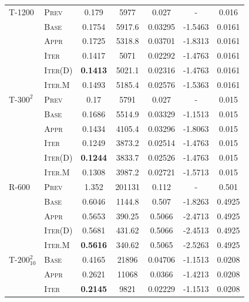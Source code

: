 \begin{table}[H]
\begin{center}
\begin{tabular}{llccccc}
    
    T-1200         & \textsc{Prev}         & 0.179  & 5977   & 0.027   &    -    & 0.016 \\
                   & \textsc{Base}      & 0.1754 & 5917.6 & 0.03295 & -1.5463 & 0.0161 \\
                   & \textsc{Appr}     & 0.1725 & 5318.8 & 0.03701 & -1.8313 & 0.0161 \\
                   & \textsc{Iter}       & 0.1417 & 5071  & 0.02292 & -1.4763 & 0.0161 \\
                   & \textsc{Iter(D)} & \textbf{0.1413} & 5021.1 & 0.02316 & -1.4763 & 0.0161 \\
                   & \textsc{Iter.M} & 0.1493 & 5185.4 & 0.02576	& -1.5363 &	0.0161\\
    \hline\rule{0pt}{2.5ex}
    T-$300^2$      & \textsc{Prev}         & 0.17   & 5791   & 0.027   &    -    & 0.015 \\
                   & \textsc{Base}      & 0.1686 & 5514.9 & 0.03329 & -1.1513 & 0.015 \\
                   & \textsc{Appr}     & 0.1434 & 4105.4 & 0.03296 & -1.8063 & 0.015 \\
                   & \textsc{Iter}       & 0.1249 & 3873.2 & 0.02514 & -1.4763 & 0.015 \\
                   & \textsc{Iter(D)} & \textbf{0.1244} & 3833.7 & 0.02526 & -1.4763 & 0.015 \\
                   & \textsc{Iter.M} & 0.1308	& 3987.2 &	0.02721	 & -1.5713 & 0.015 \\
    \hline\rule{0pt}{2.5ex}
    R-600          & \textsc{Prev}         & 1.352  & 201131 & 0.112   &    -    & 0.501 \\
                   & \textsc{Base}      & 0.6046 & 1144.8 & 0.507   & -1.8263 & 0.4925 \\
                   & \textsc{Appr}     & 0.5653 & 390.25 & 0.5066  & -2.4713 & 0.4925 \\
                   & \textsc{Iter(D)} & 0.5681 & 431.62 & 0.5066  & -2.4513 & 0.4925 \\
                   & \textsc{Iter.M} & \textbf{0.5616} & 340.62 &	0.5065	& -2.5263 &	0.4925\\
    \hline\rule{0pt}{2.5ex}
    T-$200^2_{10}$     & \textsc{Base}      & 0.4165 & 21896  & 0.04706 & -1.1513 & 0.0208 \\
                   & \textsc{Appr}     & 0.2621 & 11068  & 0.0366  & -1.4213 & 0.0208 \\
                   & \textsc{Iter}       & \textbf{0.2145} & 9821  & 0.02229 & -1.1513 & 0.0208 \\

\end{tabular}
\end{center}
\end{table}

